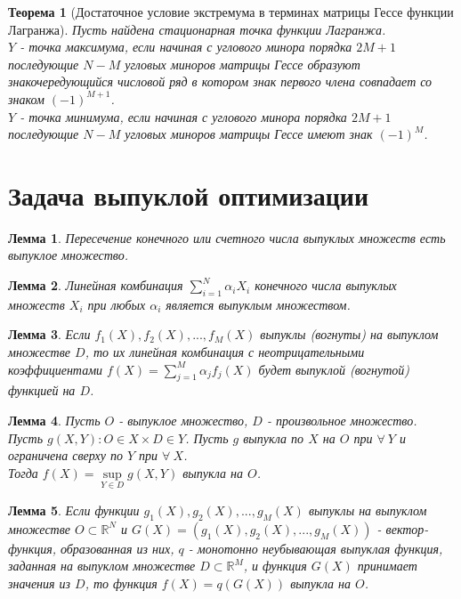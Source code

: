 \documentclass[12pt]{article}
\newtheorem{lemma}{Лемма}[section]
\newtheorem{theorem}{Теорема}[section]
\theoremstyle{definition}
\theoremstyle{remark}
\begin{document}
\begin{theorem}[Достаточное условие экстремума в терминах матрицы Гессе функции Лагранжа]
  Пусть найдена стационарная точка функции Лагранжа. \\
  $Y$ - точка максимума, если начиная с углового минора порядка $2M+1$ последующие $N-M$ угловых миноров матрицы Гессе образуют знакочередующийся
  числовой ряд в котором знак первого члена совпадает со знаком $(-1)^{M+1}$.\\
  $Y$ - точка минимума, если начиная с углового минора порядка $2M+1$ последующие $N-M$ угловых миноров матрицы Гессе имеют знак $(-1)^M$.
\end{theorem}

\section{Задача выпуклой оптимизации}
\begin{lemma}
  Пересечение конечного или счетного числа выпуклых множеств есть выпуклое множество.
\end{lemma}
\begin{lemma}
  Линейная комбинация $ \sum_{i=1}^N\alpha_iX_i$ конечного числа выпуклых множеств $X_i$ при любых $\alpha_i$ является выпуклым множеством.
\end{lemma}
\begin{lemma}
  Если $f_1(X),f_2(X),...,f_M(X)$ выпуклы (вогнуты) на выпуклом множестве $D$, то их линейная комбинация с неотрицательными коэффициентами $\displaystyle f(X)=\sum_{j=1}^M \alpha_jf_j(X) $ будет выпуклой (вогнутой) функцией на $D$.
\end{lemma}
\begin{lemma}
Пусть $O$ - выпуклое множество, $D$ - произвольное множество.\\Пусть $g(X,Y): O\in X\times D\in Y$. Пусть $g$ выпукла по $X$ на $O$ при $\forall\:Y$ и ограничена сверху по $Y$ при $\forall \:X$.\\Тогда $f(X)=\sup\limits_{Y\in D}g(X,Y)$ выпукла на $O$.
\end{lemma}
\begin{lemma}
  Если функции $g_1(X),g_2(X), ..., g_M(X)$ выпуклы на выпуклом множестве $O \subset \mathbb{R}^N$ и $G(X) = (g_1(X), g_2(X), ..., g_M(X))$ - вектор-функция, образованная из них, $q$ - монотонно неубывающая выпуклая функция, заданная на выпуклом множестве $D \subset \mathbb{R}^M$, и функция
$G(X)$ принимает значения из $D$, то функция $f (X) = q (G(X))$ выпукла на $O$.
\end{lemma}
\end{document}
